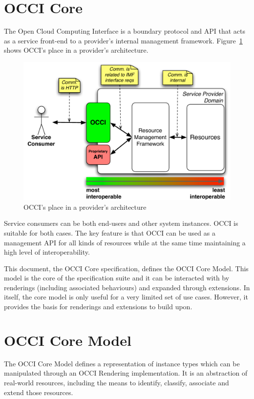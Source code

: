 \documentclass[10pt,a4paper]{article}
\begin{document}
\section{OCCI Core}
The Open Cloud Computing Interface is a boundary protocol and API
that acts as a service front-end to a provider's internal management
framework. Figure~\ref{fig:placement} shows OCCI's place in a
provider's architecture.
\begin{figure}[h]
	\centering
	\includegraphics[scale=0.5]{figs/occi-intro.pdf}
	\caption{OCCI's place in a provider's architecture}
	\label{fig:placement}
\end{figure}
Service consumers can be both end-users and other system instances. OCCI is
suitable for both cases. The key feature is that OCCI can be used as a
management API for all kinds of resources while at the same time maintaining a
high level of interoperability.

This document, the OCCI Core specification, defines the OCCI Core Model. This
model is the core of the specification suite and it can be interacted with 
by renderings (including associated behaviours) and expanded 
through extensions. In itself, the core model is only useful
for a very limited set of use cases. However, it provides the basis for
renderings and extensions to build upon.

\section{OCCI Core Model}
The OCCI Core Model defines a representation of instance types which can be
manipulated through an OCCI Rendering implementation. 
It is an abstraction of real-world 
resources, including the means to identify, classify, associate 
and extend those resources. 
\end{document}
